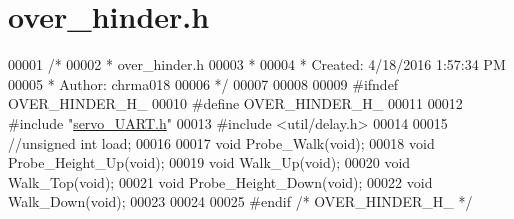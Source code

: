 \hypertarget{over__hinder_8h_source}{}\section{over\+\_\+hinder.\+h}
\label{over__hinder_8h_source}

\begin{DoxyCode}
00001 \textcolor{comment}{/*}
00002 \textcolor{comment}{ * over\_hinder.h}
00003 \textcolor{comment}{ *}
00004 \textcolor{comment}{ * Created: 4/18/2016 1:57:34 PM}
00005 \textcolor{comment}{ *  Author: chrma018}
00006 \textcolor{comment}{ */} 
00007 
00008 
00009 \textcolor{preprocessor}{#ifndef OVER\_HINDER\_H\_}
00010 \textcolor{preprocessor}{#define OVER\_HINDER\_H\_}
00011 
00012 \textcolor{preprocessor}{#include "\hyperlink{servo___u_a_r_t_8h}{servo\_UART.h}"}
00013 \textcolor{preprocessor}{#include <util/delay.h>}
00014 
00015 \textcolor{comment}{//unsigned int load;}
00016 
00017 \textcolor{keywordtype}{void} Probe\_Walk(\textcolor{keywordtype}{void});
00018 \textcolor{keywordtype}{void} Probe\_Height\_Up(\textcolor{keywordtype}{void}); 
00019 \textcolor{keywordtype}{void} Walk\_Up(\textcolor{keywordtype}{void}); 
00020 \textcolor{keywordtype}{void} Walk\_Top(\textcolor{keywordtype}{void});
00021 \textcolor{keywordtype}{void} Probe\_Height\_Down(\textcolor{keywordtype}{void}); 
00022 \textcolor{keywordtype}{void} Walk\_Down(\textcolor{keywordtype}{void}); 
00023 
00024 
00025 \textcolor{preprocessor}{#endif }\textcolor{comment}{/* OVER\_HINDER\_H\_ */}\textcolor{preprocessor}{}
\end{DoxyCode}
